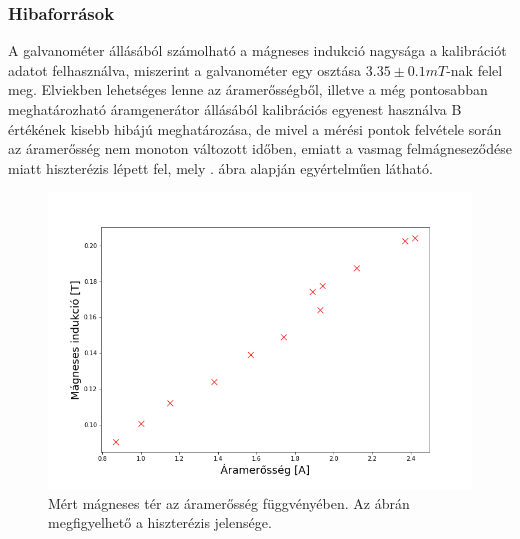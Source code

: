 \documentclass[a4paper,12pt]{article}
\begin{document}
\subsubsection{Hibaforrások}
A galvanométer állásából számolható a mágneses indukció nagysága a kalibrációt adatot felhasználva, miszerint a galvanométer egy osztása $3.35\pm0.1 mT$-nak felel meg. Elviekben lehetséges lenne az áramerősségből, illetve a még pontosabban meghatározható áramgenerátor állásából kalibrációs egyenest használva B értékének kisebb hibájú meghatározása, de mivel a mérési pontok felvétele során az áramerősség nem monoton változott időben, emiatt a vasmag felmágneseződése miatt hiszterézis lépett fel, mely . ábra alapján egyértelműen látható.

\begin{figure}[h]
\centering
    \begin{minipage}{.99\textwidth}
        \centering
        \includegraphics[width=1.\linewidth]{hiszterezis.png}
    \end{minipage}
    \caption{Mért mágneses tér az áramerősség függvényében. Az ábrán megfigyelhető a hiszterézis jelensége.}
    \label{fig:hist}
\end{figure}
\end{document}
